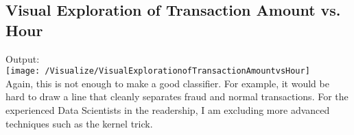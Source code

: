 \documentclass[17pt]{report}
\begin{document}
\subsection{Visual Exploration of Transaction Amount vs. Hour}

Output:\\
\texttt{[image: /Visualize/VisualExplorationofTransactionAmountvsHour]}\\
Again, this is not enough to make a good classifier. For example, it would be hard to draw a line that cleanly
separates fraud and normal transactions. For the experienced Data Scientists in the readership, I am excluding
more advanced techniques such as the kernel trick.\\
\end{document}
